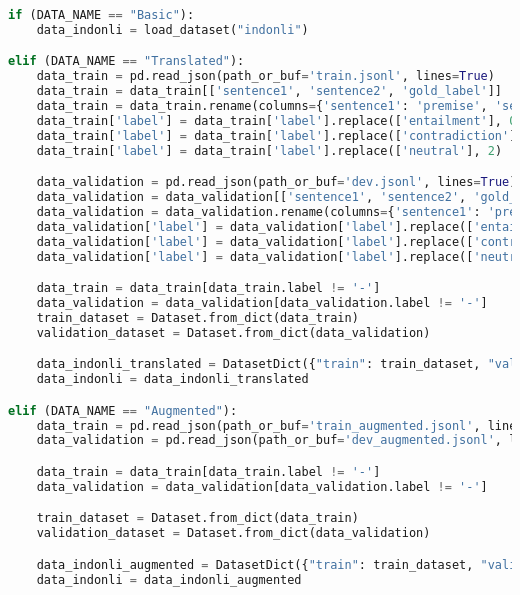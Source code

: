 \begin{lstlisting}[language=Python, caption=Mengimpor \emph{dataset} IndoNLI]
if (DATA_NAME == "Basic"):
    data_indonli = load_dataset("indonli")

elif (DATA_NAME == "Translated"):
    data_train = pd.read_json(path_or_buf='train.jsonl', lines=True)
    data_train = data_train[['sentence1', 'sentence2', 'gold_label']]
    data_train = data_train.rename(columns={'sentence1': 'premise', 'sentence2': 'hypothesis', 'gold_label': 'label'})
    data_train['label'] = data_train['label'].replace(['entailment'], 0)
    data_train['label'] = data_train['label'].replace(['contradiction'], 1)
    data_train['label'] = data_train['label'].replace(['neutral'], 2)

    data_validation = pd.read_json(path_or_buf='dev.jsonl', lines=True)
    data_validation = data_validation[['sentence1', 'sentence2', 'gold_label']]
    data_validation = data_validation.rename(columns={'sentence1': 'premise', 'sentence2': 'hypothesis', 'gold_label': 'label'})
    data_validation['label'] = data_validation['label'].replace(['entailment'], 0)
    data_validation['label'] = data_validation['label'].replace(['contradiction'], 1)
    data_validation['label'] = data_validation['label'].replace(['neutral'], 2)

    data_train = data_train[data_train.label != '-']
    data_validation = data_validation[data_validation.label != '-']
    train_dataset = Dataset.from_dict(data_train)
    validation_dataset = Dataset.from_dict(data_validation)

    data_indonli_translated = DatasetDict({"train": train_dataset, "validation": validation_dataset})
    data_indonli = data_indonli_translated

elif (DATA_NAME == "Augmented"):
    data_train = pd.read_json(path_or_buf='train_augmented.jsonl', lines=True)
    data_validation = pd.read_json(path_or_buf='dev_augmented.jsonl', lines=True)

    data_train = data_train[data_train.label != '-']
    data_validation = data_validation[data_validation.label != '-']

    train_dataset = Dataset.from_dict(data_train)
    validation_dataset = Dataset.from_dict(data_validation)

    data_indonli_augmented = DatasetDict({"train": train_dataset, "validation": validation_dataset})
    data_indonli = data_indonli_augmented
\end{lstlisting}

